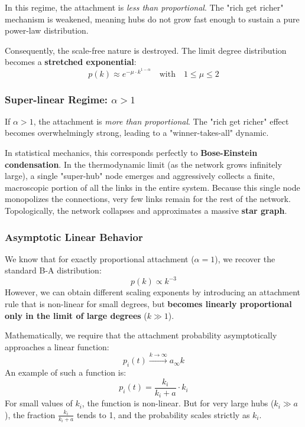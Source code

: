 In this regime, the attachment is \textit{less than proportional}. The "rich get richer" mechanism is weakened, meaning hubs do not grow fast enough to sustain a pure power-law distribution.

Consequently, the scale-free nature is destroyed. The limit degree distribution becomes a \textbf{stretched exponential}:
\[
    p(k) \approx e^{-\mu \cdot k^{1-\alpha}} \quad \text{with} \quad 1 \leq \mu \leq 2
\]

\subsubsection{Super-linear Regime: \( \alpha > 1 \)}

If \( \alpha > 1 \), the attachment is \textit{more than proportional}. The "rich get richer" effect becomes overwhelmingly strong, leading to a "winner-takes-all" dynamic.

In statistical mechanics, this corresponds perfectly to \textbf{Bose-Einstein condensation}. In the thermodynamic limit (as the network grows infinitely large), a single "super-hub" node emerges and aggressively collects a finite, macroscopic portion of all the links in the entire system. Because this single node monopolizes the connections, very few links remain for the rest of the network.
Topologically, the network collapses and approximates a massive \textbf{star graph}.

\subsubsection{Asymptotic Linear Behavior}

We know that for exactly proportional attachment (\( \alpha = 1 \)), we recover the standard B-A distribution:
\[
    p(k) \propto k^{-3}
\]
However, we can obtain different scaling exponents by introducing an attachment rule that is non-linear for small degrees, but \textbf{becomes linearly proportional only in the limit of large degrees} (\( k \gg 1 \)).

Mathematically, we require that the attachment probability asymptotically approaches a linear function:
\[
    p_i(t) \xrightarrow{k \to \infty} a_\infty k
\]
An example of such a function is:
\[
    p_i(t) = \frac{k_i}{k_i + a} \cdot k_i
\]
For small values of \( k_i \), the function is non-linear. But for very large hubs (\( k_i \gg a \)), the fraction \( \frac{k_i}{k_i + a} \) tends to 1, and the probability scales strictly as \( k_i \).

